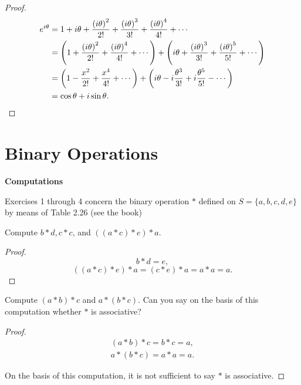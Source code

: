 \begin{proof}
    \begin{align*}
        e^{i\theta} & = 1 + i\theta + \frac{{(i\theta)}^{2}}{2!} + \frac{{(i\theta)}^{3}}{3!} + \frac{{(i\theta)}^{4}}{4!} + \cdots                                                                 \\
                    & = \left(1 + \frac{{(i\theta)}^{2}}{2!} + \frac{{(i\theta)}^{4}}{4!} + \cdots\right) + \left(i\theta + \frac{{(i\theta)}^{3}}{3!} + \frac{{(i\theta)}^{5}}{5!} + \cdots\right) \\
                    & = \left(1 - \frac{x^{2}}{2!} + \frac{x^{4}}{4!} + \cdots \right) + \left(i\theta - i\frac{\theta^{3}}{3!} + i\frac{\theta^{5}}{5!} - \cdots \right)                           \\
                    & = \cos{\theta} + i\sin{\theta}.\qedhere
    \end{align*}
\end{proof}

\section{Binary Operations}
\setcounter{exercise}{0}

\textbf{Computations}

Exercises 1 through 4 concern the binary operation $*$ defined on $S = \{a, b, c, d, e\}$ by means of Table 2.26 (see the book)

\begin{exercise}
    Compute $b * d, c * c$, and $((a * c) * e) * a$.
\end{exercise}

\begin{proof}
    \[
        b * d = e,
    \]
    \[
        ((a * c) * e) * a = (c * e) * a = a * a = a.
    \]
\end{proof}

\begin{exercise}
    Compute $(a * b) * c$ and $a * (b * c)$. Can you say on the basis of this computation whether $*$ is associative?
\end{exercise}

\begin{proof}
    \[
        \begin{split}
            (a * b) * c = b * c = a, \\
            a * (b * c) = a * a = a.
        \end{split}
    \]

    On the basis of this computation, it is not sufficient to say $*$ is associative.
\end{proof}

